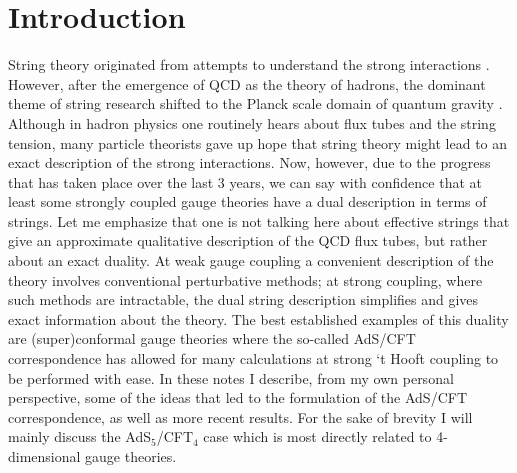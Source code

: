 \documentclass[12pt]{article}
\begin{document}
\def\rmax{{r_{\rm max}}}
\def\gone#1{}



\section{Introduction}

String theory originated from attempts to understand 
the strong interactions \cite{NNS}. However, after the emergence of QCD
as the theory of hadrons, the dominant theme of string research
shifted to the Planck scale domain of quantum gravity \cite{Scherk}. 
Although in hadron physics one routinely hears about flux tubes
and the string tension, many particle theorists gave up hope
that string theory might lead to an exact description 
of the strong interactions.
Now, however, due to the progress that has taken place
over the last 3 years, we can say with confidence
that at least some strongly coupled gauge theories have a dual description
in terms of strings. Let me emphasize that one is not talking here about
effective strings that give an approximate qualitative description
of the QCD flux tubes, but
rather about an exact duality. At weak gauge coupling a convenient
description of the theory involves conventional perturbative methods;
at strong coupling, where such methods are intractable, the dual string
description simplifies and gives exact information about the theory.
The best established examples of this duality are 
(super)conformal gauge theories
where the so-called AdS/CFT correspondence \cite{jthroat,US,EW}
has allowed for many calculations
at strong `t Hooft coupling to be performed with ease. 
In these notes I describe,
from my own personal perspective, some of the ideas that led to the formulation
of the AdS/CFT correspondence, as well as more recent results. 
For the sake of brevity I will mainly discuss the
AdS$_5$/CFT$_4$ case which is most directly related to 4-dimensional
gauge theories.
\end{document}
